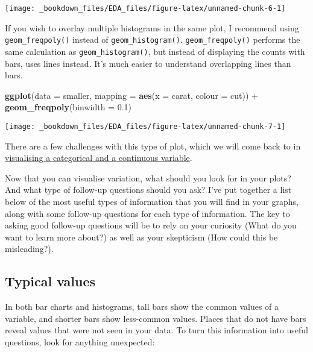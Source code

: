 \documentclass[]{book}
\newenvironment{Shaded}{\begin{snugshade}}{\end{snugshade}}
\newcommand{\KeywordTok}[1]{\textcolor[rgb]{0.13,0.29,0.53}{\textbf{{#1}}}}
\newcommand{\DataTypeTok}[1]{\textcolor[rgb]{0.13,0.29,0.53}{{#1}}}
\newcommand{\FloatTok}[1]{\textcolor[rgb]{0.00,0.00,0.81}{{#1}}}
\newcommand{\StringTok}[1]{\textcolor[rgb]{0.31,0.60,0.02}{{#1}}}
\newcommand{\NormalTok}[1]{{#1}}
\begin{document}
\begin{center}\texttt{[image: \_bookdown\_files/EDA\_files/figure-latex/unnamed-chunk-6-1]} \end{center}

If you wish to overlay multiple histograms in the same plot, I recommend
using \texttt{geom\_freqpoly()} instead of \texttt{geom\_histogram()}.
\texttt{geom\_freqpoly()} performs the same calculation as
\texttt{geom\_histogram()}, but instead of displaying the counts with
bars, uses lines instead. It's much easier to understand overlapping
lines than bars.

\begin{Shaded}
\begin{Highlighting}[]
\KeywordTok{ggplot}\NormalTok{(}\DataTypeTok{data =} \NormalTok{smaller, }\DataTypeTok{mapping =} \KeywordTok{aes}\NormalTok{(}\DataTypeTok{x =} \NormalTok{carat, }\DataTypeTok{colour =} \NormalTok{cut)) +}
\StringTok{  }\KeywordTok{geom_freqpoly}\NormalTok{(}\DataTypeTok{binwidth =} \FloatTok{0.1}\NormalTok{)}
\end{Highlighting}
\end{Shaded}

\begin{center}\texttt{[image: \_bookdown\_files/EDA\_files/figure-latex/unnamed-chunk-7-1]} \end{center}

There are a few challenges with this type of plot, which we will come
back to in \protect\hyperlink{cat-cont}{visualising a categorical and a
continuous variable}.

Now that you can visualise variation, what should you look for in your
plots? And what type of follow-up questions should you ask? I've put
together a list below of the most useful types of information that you
will find in your graphs, along with some follow-up questions for each
type of information. The key to asking good follow-up questions will be
to rely on your curiosity (What do you want to learn more about?) as
well as your skepticism (How could this be misleading?).

\subsection{Typical values}\label{typical-values}

In both bar charts and histograms, tall bars show the common values of a
variable, and shorter bars show less-common values. Places that do not
have bars reveal values that were not seen in your data. To turn this
information into useful questions, look for anything unexpected:
\end{document}
